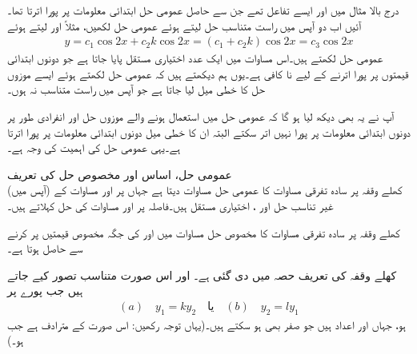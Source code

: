 درج بالا مثال میں  اور  ایسے تفاعل تھے جن سے حاصل عمومی حل ابتدائی معلومات پر پورا اترتا تھا۔آئیں اب دو آپس میں راست متناسب حل لیتے ہوئے عمومی حل  لکھیں، مثلاً  اور  لیتے ہوئے
\begin{align*}
y=c_1\cos 2x+c_2 k\cos 2x=(c_1+c_2k)\cos 2x=c_3\cos 2x
\end{align*}
عمومی حل لکھتے ہیں۔اس مساوات میں ایک عدد اختیاری مستقل  پایا جاتا ہے جو دونوں ابتدائی قیمتوں پر پورا اترنے کے لیے نا کافی ہے۔یوں ہم دیکھتے ہیں کہ عمومی حل لکھتے ہوئے ایسے موزوں حل کا خطی میل لیا جاتا ہے جو آپس میں راست  متناسب نہ ہوں۔

 آپ نے یہ بھی دیکھ لیا ہو گا کہ عمومی حل میں استعمال ہونے والے موزوں حل  اور  انفرادی طور پر دونوں ابتدائی معلومات پر پورا نہیں اتر سکتے البتہ ان کا خطی میل دونوں ابتدائی معلومات پر پورا اترتا ہے۔یہی عمومی حل کی اہمیت کی وجہ ہے۔

\quad عمومی حل، اساس اور مخصوص حل کی تعریف\\
کھلے وقفہ  پر سادہ تفرقی مساوات  کا عمومی حل مساوات  دیتا ہے جہاں  پر  اور  مساوات   کے  (آپس میں) غیر تناسب حل اور ،  اختیاری مستقل ہیں۔فاصلہ  پر  اور  مساوات  کی  حل کہلاتے ہیں۔

کھلے وقفہ  پر سادہ تفرقی مساوات  کا مخصوص حل مساوات  میں  اور  کی جگہ مخصوص قیمتیں پر کرنے سے حاصل ہوتا ہے۔

کھلے وقفہ کی تعریف حصہ  میں دی گئی ہے۔  اور  اس صورت   متناسب  تصور کیے جاتے ہیں  جب پورے  پر
\begin{align}
(a)\quad y_1=ky_2 \quad \text{یا} \quad  (b) \quad y_2=ly_1
\end{align} 
ہو، جہاں  اور  اعداد ہیں جو صفر بھی ہو سکتے ہیں۔(یہاں توجہ رکھیں:  اس صورت  کے مترادف ہے جب  ہو۔)

